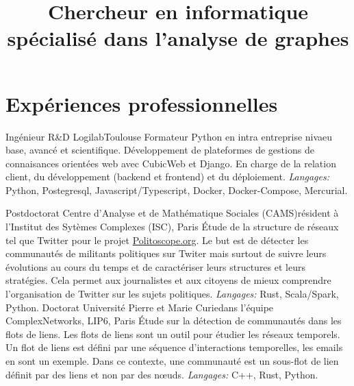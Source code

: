 \documentclass[11pt,a4paper]{moderncv}
\title{Chercheur en informatique spécialisé dans l'analyse de graphes}
\begin{document}
\maketitle
\vspace{-1.2cm}

\section{Expériences professionnelles}

 {Ingénieur R\&D} {Logilab}{}{Toulouse}
{
	Formateur Python en intra entreprise nivaeu base, avancé et scientifique.
	Développement de plateformes de gestions de connaisances orientées web avec CubicWeb et Django. En charge de la relation client, du développement (backend et frontend) et du déploiement.
	\textit{Langages:} Python, Postegresql, Javascript/Typescript, Docker, Docker-Compose, Mercurial.
}

\vspace*{0.2cm}
 {Postdoctorat} {Centre d’Analyse et de Mathématique Sociales (CAMS)}{}{résident à l'Institut des Sytèmes Complexes (ISC), Paris}
{
	Étude de la structure de réseaux tel que Twitter pour le projet \url{Politoscope.org}. Le but est de détecter les communautés de militants politiques sur Twiter mais surtout de suivre leurs évolutions au cours du temps et de caractériser leurs structures et leurs stratégies. Cela permet aux journalistes et aux citoyens de mieux comprendre l'organisation de Twitter sur les sujets politiques. \textit{Langages:} Rust, Scala/Spark, Python.
}
\vspace*{0.2cm}
 {Doctorat} {Université Pierre et Marie Curie}{}{dans l'équipe ComplexNetworks, LIP6, Paris}
{
 Étude sur la détection de communautés dans les flots de liens. Les flots de liens sont un outil pour étudier les réseaux temporels.
 Un flot de liens est défini par une séquence d'interactions temporelles, les emails en sont un exemple. Dans ce contexte, une communauté est un sous-flot de lien définit par des liens et non par des n\oe uds. \textit{Langages:} C++, Rust, Python.
}
\vspace*{0.2cm}
%
\vspace*{0.2cm}
\end{document}
